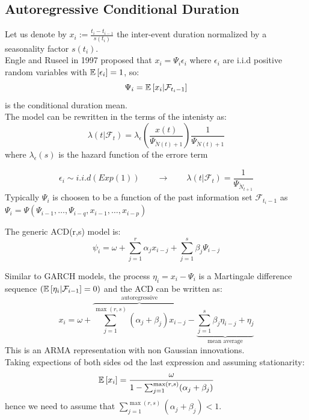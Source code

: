 \subsection{Autoregressive Conditional Duration}
Let us denote by $x_i:= \frac{t_i - t_{i-1}}{s(t_i)}$ the inter-event duration normalized by a seasonality factor $s(t_i)$.\\
Engle and Ruseel in 1997 proposed that $x_i = \Psi_i \epsilon_i$ where $\epsilon_i$ are i.i.d positive random variables with $\mathbb{E}\left[\epsilon_i\right] =1$, so:
\[
\Psi_i = \mathbb{E}\left[x_i| \mathcal{F}_{t_i-1}\right]
\]
is the conditional duration mean.\\
The model can be rewritten in the terms of the intenisty as:
\[
\lambda(t|\mathcal{F}_t) = \lambda_\epsilon \left(\frac{x(t)}{\Psi_{\breve{N}(t) + 1}}\right) \frac{1}{\Psi_{\breve{N}(t) +1}}
\]
where $\lambda_\epsilon(s)$ is the hazard function of the errore term 
\begin{mytheorem}
	\[
	\epsilon_i \sim i.i.d(Exp(1)) \qquad \to \qquad \lambda(t|\mathcal{F}_t) = \frac{1}{\Psi_{\breve{N}_{t+1}}}
    \]
Typically $\Psi_i$ is choosen to be a function of the past information set $\mathcal{F}_{t_i-1}$ as \\ $\Psi_i = \Psi(\Psi_{i-1},\ldots, \Psi_{i-q}, x_{i-1},\ldots,x_{i-p})$
\end{mytheorem}
\begin{mytheorem}
	The generic ACD(r,s) model is:
	\[
	\psi_i = \omega + \sum_{j=1}^{r} \alpha_jx_{i-j} + \sum_{j=1}^{s} \beta_j \Psi_{i-j}
	\]
\end{mytheorem}
Similar to GARCH models, the process $\eta_i =x_i -\Psi_i$ is a Martingale difference sequence $(\mathbb{E}\left[\eta_i|\mathcal{F}_{i-1}\right]=0)$ and the ACD can be written as:
\[
x_i = \omega + \overbrace{\sum_{j=1}^{\max(r,s)} (\alpha_j + \beta_j)x_{i-j}}^{\text{autoregressive}} - \underbrace{\sum_{j=1}^{s} \beta_j \eta_{i-j} + \eta_j}_{\text{mean average}}
\]
This is an ARMA representation with non Gaussian innovations.\\ Taking expections of both sides od the last expression and assuming stationarity:
\[
\mathbb{E}\left[x_i\right] = \frac{\omega}{1 - \sum_{j=1}^{\max(r,s)} (\alpha_j + \beta_j)}
\]
hence we need to assume that $\sum_{j=1}^{\max{(r,s)}} (\alpha_j + \beta_j) <1$.\\
